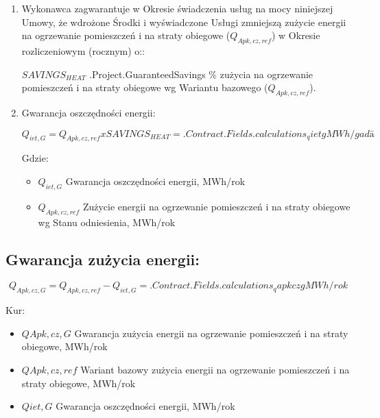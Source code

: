 \begin{enumerate}
	\item Wykonawca zagwarantuje w Okresie świadczenia usług na mocy niniejszej Umowy, że wdrożone Środki i wyświadczone Usługi zmniejszą zużycie energii na ogrzewanie pomieszczeń i na straty obiegowe ($Q_{Apk,cz,ref}$) w Okresie rozliczeniowym (rocznym) o::

	$SAVINGS_{HEAT}$ \iffalse input project.savings value="{{.Project.GuaranteedSavings}}" \fi {{.Project.GuaranteedSavings}} \% zużycia na ogrzewanie pomieszczeń i na straty obiegowe wg Wariantu bazowego ($Q_{Apk,cz,ref}$).

	\item Gwarancja oszczędności energii:

\[Q_{iet,G} = Q_{Apk, cz, ref} x SAVINGS_{HEAT}  = {{.Contract.Fields.calculations_qietg}} MWh/gadā\]

Gdzie:
\begin{itemize}
	\item $Q_{iet,G}$	Gwarancja oszczędności energii, MWh/rok
	\item $Q_{Apk,cz,ref}$	Zużycie energii na ogrzewanie pomieszczeń i na straty obiegowe wg Stanu odniesienia, MWh/rok
\end{itemize}

\end{enumerate}

\subsection{Gwarancja zużycia energii:}

\[Q_{Apk,cz,G} = Q_{Apk,cz,ref} - Q_{iet,G} = {{.Contract.Fields.calculations_qapkczg}} MWh/rok\]

Kur:

\begin{itemize}
	\item $QApk,cz,G$	Gwarancja zużycia energii na ogrzewanie pomieszczeń i na straty obiegowe, MWh/rok
	\item $QApk,cz,ref$	Wariant bazowy zużycia energii na ogrzewanie pomieszczeń i na straty obiegowe, MWh/rok
	\item $Qiet,G$	Gwarancja oszczędności energii, MWh/rok
\end{itemize}
